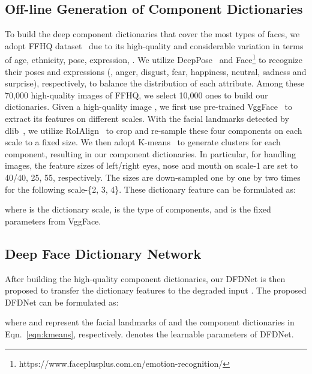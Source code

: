 \documentclass[runningheads]{llncs}
\begin{document}
\setcounter{footnote}{0}
\subsection{Off-line Generation of Component Dictionaries}\label{dictionary}
To build the deep component dictionaries that cover the most types of faces, we adopt FFHQ dataset~\cite{karras2019style} due to its high-quality and considerable variation in terms of age, ethnicity, pose, expression, \etc. We utilize DeepPose~\cite{Ruiz_2018_CVPR_Workshops} and Face\footnote{https://www.faceplusplus.com.cn/emotion-recognition/} to recognize their poses and expressions (\ie, anger, disgust, fear, happiness, neutral, sadness and surprise), respectively, to balance the distribution of each attribute. Among these 70,000 high-quality images of FFHQ, we select 10,000 ones to build our dictionaries. Given a high-quality image , we first use pre-trained VggFace~\cite{cao2018vggface2} to extract its features on different scales. With the facial landmarks  detected by dlib~\cite{dlib09},
we utilize RoIAlign~\cite{he2017mask} to crop and re-sample these four components on each scale to a fixed size. We then adopt K-means~\cite{scikit_learn} to generate  clusters for each component, resulting in our component dictionaries. In particular, for handling  images, the feature sizes of left/right eyes, nose and mouth on scale-1 are set to 40/40, 25, 55, respectively. The sizes are down-sampled one by one by two times for the following scale-\{2, 3, 4\}. These dictionary feature can be formulated as:

where  is the dictionary scale,  is the type of components, and  is the fixed parameters from VggFace.

\subsection{Deep Face Dictionary Network}
After building the high-quality component dictionaries, our DFDNet is then proposed to transfer the dictionary features to the degraded input . The proposed DFDNet can be formulated as:

where  and  represent the facial landmarks of  and the component dictionaries in Eqn.~\ref{eqn:kmeans}, respectively.  denotes the learnable parameters of DFDNet.
\end{document}
